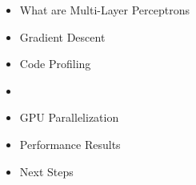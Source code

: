 \begin{frame}
\begin{itemize}
    \item What are Multi-Layer Perceptrons
    \item Gradient Descent
    \item Code Profiling
    \item \textbf{\color{red}{CPU Parallelization}}
    \item GPU Parallelization
    \item Performance Results 
    \item Next Steps
\end{itemize}
\end{frame}


